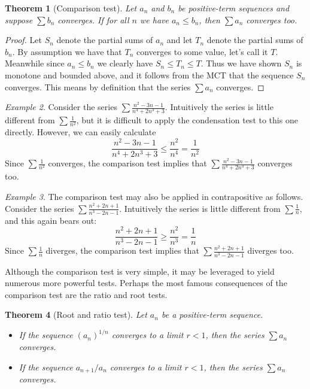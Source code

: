 \documentclass[11pt,oneside]{amsbook}
\theoremstyle{definition}
\theoremstyle{plain}
\newtheorem{thm}{Theorem}[section]
\theoremstyle{definition}
\theoremstyle{remark}
\newtheorem{example}[thm]{Example}
\numberwithin{equation}{section}
\numberwithin{figure}{section}
\begin{document}
\begin{thm}[Comparison test]
  Let $a_n$ and $b_n$ be positive-term sequences and suppose $\sum b_n$ converges. If for all $n$ we have $a_n\leq b_n$, then $\sum a_n$ converges too.
\end{thm}

\begin{proof}
  Let $S_n$ denote the partial sums of $a_n$ and let $T_n$ denote the partial sums of $b_n$. By assumption we have that $T_n$ converges to some value, let's call it $T$. Meanwhile since $a_n\leq b_n$ we clearly have $S_n\leq T_n\leq T$. Thus we have shown $S_n$ is monotone and bounded above, and it follows from the MCT that the sequence $S_n$ converges. This means by definition that the series $\sum a_n$ converges.
\end{proof}

\begin{example}
  Consider the series $\sum\frac{n^2-3n-1}{n^4+2n^3+3}$. Intuitively the series is little different from $\sum\frac{1}{n^2}$, but it is difficult to apply the condensation test to this one directly. However, we can easily calculate
  \[\frac{n^2-3n-1}{n^4+2n^3+3}\leq\frac{n^2}{n^4}=\frac{1}{n^2}
  \]
  Since $\sum\frac{1}{n^2}$ converges, the comparison test implies that $\sum\frac{n^2-3n-1}{n^4+2n^3+3}$ converges too.
\end{example}

\begin{example}
  The comparison test may also be applied in contrapositive as follows. Consider the series $\sum\frac{n^2+2n+1}{n^3-2n-1}$. Intuitively the series is little different from $\sum\frac1n$, and this again bears out:
  \[\frac{n^2+2n+1}{n^3-2n-1}\geq\frac{n^2}{n^3}=\frac1n
  \]
  Since $\sum\frac1n$ diverges, the comparison test implies that $\sum\frac{n^2+2n+1}{n^3-2n-1}$ diverges too.
\end{example}

Although the comparison test is very simple, it may be leveraged to yield numerous more powerful tests. Perhaps the most famous consequences of the comparison test are the ratio and root tests.

\begin{thm}[Root and ratio test]
  Let $a_n$ be a positive-term sequence.
  \begin{itemize}
  \item If the sequence $(a_n)^{1/n}$ converges to a limit $r<1$, then the series $\sum a_n$ converges.
  \item If the sequence $a_{n+1}/a_n$ converges to a limit $r<1$, then the series $\sum a_n$ converges.
  \end{itemize}
\end{thm}
\end{document}
